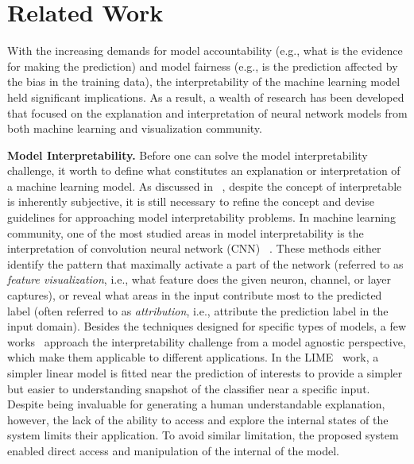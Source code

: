 
\section{Related Work}
With the increasing demands for model accountability (e.g., what is the evidence for making the prediction) and model fairness (e.g., is the prediction affected by the bias in the training data),
the interpretability of the machine learning model held significant implications. As a result, a wealth of research has been developed that focused on the explanation and interpretation of neural network models from both machine learning and visualization community.

\textbf{Model Interpretability.}
Before one can solve the model interpretability challenge, it worth to define what constitutes an explanation or interpretation of a machine learning model.
As discussed in ~\cite{Lipton2016, Doshi-Velez2017}, despite the concept of interpretable is inherently subjective, it is still necessary to refine the concept and devise guidelines for approaching model interpretability problems.
In machine learning community, one of the most studied areas in model interpretability is the interpretation of convolution neural network (CNN) ~\cite{SimonyanVedaldiZisserman2013, ZeilerFergus2014, YosinskiCluneNguyen2015, OlahMordvintsevSchubert2017, OlahSatyanarayanJohnson2018}.
%
These methods either identify the pattern that maximally activate a part of the network (referred to as \emph{feature visualization}, i.e., what feature does the given neuron, channel, or layer captures), or reveal what areas in the input contribute most to the predicted label (often referred to as \emph{attribution}, i.e., attribute the prediction label in the input domain).
%
Besides the techniques designed for specific types of models, a few works~\cite{RibeiroSinghGuestrin2016, LundbergLee2017} approach the interpretability challenge from a model agnostic perspective, which make them applicable to different applications. In the LIME~\cite{RibeiroSinghGuestrin2016} work, a simpler linear model is fitted near the prediction of interests to provide a simpler but easier to understanding snapshot of the classifier near a specific input.
%
Despite being invaluable for generating a human understandable explanation, however, the lack of the ability to access and explore the internal states of the system limits their application. 
To avoid similar limitation, the proposed system enabled direct access and manipulation of the internal of the model.

